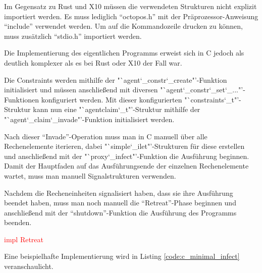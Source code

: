 Im Gegensatz zu Rust und X10 müssen die verwendeten Strukturen nicht explizit importiert werden. Es muss lediglich
"`octopos.h"' mit der Präprozessor-Anweisung "`include"' verwendet werden.
Um auf die Kommandozeile drucken zu können, muss zusätzlich "`stdio.h"' importiert werden.

Die Implementierung des eigentlichen Programms erweist sich in C jedoch als deutlich komplexer als es bei
Rust oder X10 der Fall war.

Die Constraints werden mithilfe der "`agent\char`_constr\char`_create"'-Funktion initialisiert
und müssen anschließend mit diversen "`agent\char`_constr\char`_set\char`_..."'-Funktionen konfiguriert werden.
Mit dieser konfigurierten "`constraints\char`_t"'-Struktur kann nun eine "`agentclaim\char`_t"'-Struktur mithilfe
der "`agent\char`_claim\char`_invade"'-Funktion initialisiert werden.

Nach dieser "`Invade"'-Operation muss man in C manuell über alle Rechenelemente iterieren, dabei
"`simple\char`_ilet"'-Strukturen für diese erstellen und anschließend mit der "`proxy\char`_infect"'-Funktion
die Ausführung beginnen. Damit der Hauptfaden auf das Ausführungsende der einzelnen Rechenelemente wartet, muss
man manuell Signalstrukturen verwenden.

Nachdem die Recheneinheiten signalisiert haben, dass sie ihre Ausführung beendet haben, muss man noch manuell
die "`Retreat"'-Phase beginnen und anschließend mit der "`shutdown"'-Funktion die Ausführung des Programms beenden.

\textcolor{red}{impl Retreat}

Eine beispielhafte Implementierung wird in Listing \ref{code:c_minimal_infect} veranschaulicht.

